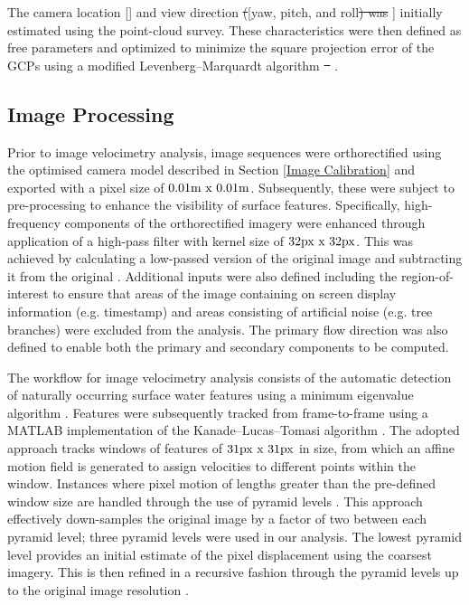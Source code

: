 \documentclass[hess, manuscript]{copernicus} %
\providecommand{\DIFadd}[1]{{\protect\color{blue}\uwave{#1}}} %
\providecommand{\DIFdel}[1]{{\protect\color{red}\sout{#1}}} %
\providecommand{\DIFaddbegin}{} %
\providecommand{\DIFaddend}{} %
\providecommand{\DIFdelbegin}{} %
\providecommand{\DIFdelend}{} %
\newcommand{\DIFscaledelfig}{0.5}
\newlength{\DIFdelgraphicswidth} %
\newlength{\DIFdelgraphicsheight} %
\newcommand{\DIFaddincludegraphics}[2][]{{\color{blue}\fbox{\DIFOincludegraphics[#1]{#2}}}} %
\newcommand{\DIFdelincludegraphics}[2][]{%
\sbox{\DIFdelgraphicsbox}{\DIFOincludegraphics[#1]{#2}}%
\settoboxwidth{\DIFdelgraphicswidth}{\DIFdelgraphicsbox} %
\settoboxtotalheight{\DIFdelgraphicsheight}{\DIFdelgraphicsbox} %
\scalebox{\DIFscaledelfig}{%
\parbox[b]{\DIFdelgraphicswidth}{\usebox{\DIFdelgraphicsbox}\\[-\baselineskip] \rule{\DIFdelgraphicswidth}{0em}}\llap{\resizebox{\DIFdelgraphicswidth}{\DIFdelgraphicsheight}{%
\setlength{\unitlength}{\DIFdelgraphicswidth}%
\begin{picture}(1,1)%
\thicklines\linethickness{2pt} %
{\color[rgb]{1,0,0}\put(0,0){\framebox(1,1){}}}%
{\color[rgb]{1,0,0}\put(0,0){\line( 1,1){1}}}%
{\color[rgb]{1,0,0}\put(0,1){\line(1,-1){1}}}%
\end{picture}%
}\hspace*{3pt}}} %
} %
\DeclareRobustCommand{\DIFaddbegin}{\DIFOaddbegin \let\includegraphics\DIFaddincludegraphics} %
\DeclareRobustCommand{\DIFaddend}{\DIFOaddend \let\includegraphics\DIFOincludegraphics} %
\DeclareRobustCommand{\DIFdelbegin}{\DIFOdelbegin \let\includegraphics\DIFdelincludegraphics} %
\DeclareRobustCommand{\DIFdelend}{\DIFOaddend \let\includegraphics\DIFOincludegraphics} %
\begin{document}
The camera location \DIFaddbegin [\DIFadd{x, y, z}] \DIFaddend and view direction \DIFdelbegin \DIFdel{(}\DIFdelend \DIFaddbegin [\DIFaddend yaw, pitch, and roll\DIFdelbegin \DIFdel{) was }\DIFdelend \DIFaddbegin ] \DIFadd{were }\DIFaddend initially estimated using the point-cloud survey. These characteristics were then defined as free parameters and optimized to minimize the square projection error of the GCPs using a modified Levenberg–Marquardt algorithm \DIFdelbegin \DIFdel{\mbox{%
\citep{Fletcher1971}}\hskip0pt%
}\DIFdelend \DIFaddbegin \DIFadd{\mbox{%
\citep{Fletcher1971, Messerli2015}}\hskip0pt%
}\DIFaddend .

\subsection{Image Processing}
Prior to image velocimetry analysis, image sequences were orthorectified using the optimised camera model described in Section \ref{Image Calibration} and exported with a pixel size of $\textnormal{0.01m x 0.01m}$. Subsequently, these were subject to pre-processing to enhance the visibility of surface features. Specifically, high-frequency components of the orthorectified imagery were enhanced through application of a high-pass filter with kernel size of $\textnormal{32px x 32px}$. This was achieved by calculating a low-passed version of the original image and subtracting it from the original \citep{Thielicke2021}. Additional inputs were also defined including the region-of-interest to ensure that areas of the image containing on screen display information (e.g. timestamp) and areas consisting of artificial noise (e.g. tree branches) were excluded from the analysis. The primary flow direction was also defined to enable both the primary and secondary components to be computed. 

The workflow for image velocimetry analysis consists of the automatic detection of naturally occurring surface water features using a minimum eigenvalue algorithm \citep{Shi1994}. Features were subsequently tracked from frame-to-frame using a MATLAB implementation of the Kanade–Lucas–Tomasi algorithm \citep{Lucas1981, Tomasi1991, Shi1994, Perks2020a}. The adopted approach tracks windows of features of $\textnormal{31px x 31px}$ in size, from which an affine motion field is generated to assign velocities to different points within the window. Instances where pixel motion of lengths greater than the pre-defined window size are handled through the use of pyramid levels \citep{Bouguet2000}. This approach effectively down-samples the original image by a factor of two between each pyramid level; three pyramid levels were used in our analysis. The lowest pyramid level provides an initial estimate of the pixel displacement using the coarsest imagery. This is then refined in a recursive fashion through the pyramid levels up to the original image resolution \citep{Bouguet2000}.
\end{document}
